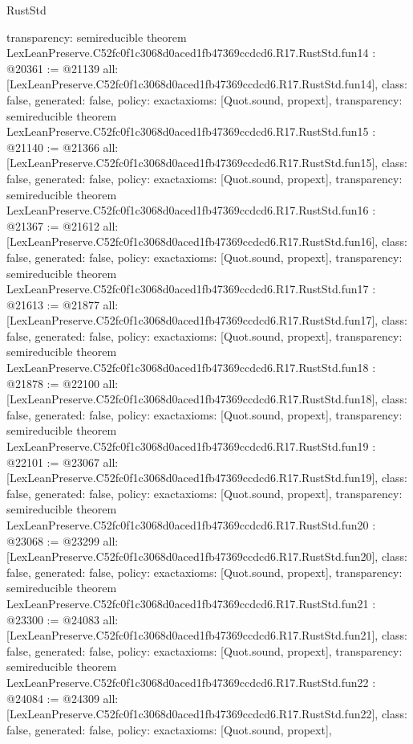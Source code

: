 \begin{lexlean}{RustStd}
\begin{coremodule}
{  transparency: semireducible
}
theorem LexLeanPreserve.C52fc0f1c3068d0aced1fb47369ccdcd6.R17.RustStd.fun14 : @20361 := @21139 {
  all: [LexLeanPreserve.C52fc0f1c3068d0aced1fb47369ccdcd6.R17.RustStd.fun14],
  class: false,
  generated: false,
  policy: exact{axioms: [Quot.sound, propext]},
  transparency: semireducible
}
theorem LexLeanPreserve.C52fc0f1c3068d0aced1fb47369ccdcd6.R17.RustStd.fun15 : @21140 := @21366 {
  all: [LexLeanPreserve.C52fc0f1c3068d0aced1fb47369ccdcd6.R17.RustStd.fun15],
  class: false,
  generated: false,
  policy: exact{axioms: [Quot.sound, propext]},
  transparency: semireducible
}
theorem LexLeanPreserve.C52fc0f1c3068d0aced1fb47369ccdcd6.R17.RustStd.fun16 : @21367 := @21612 {
  all: [LexLeanPreserve.C52fc0f1c3068d0aced1fb47369ccdcd6.R17.RustStd.fun16],
  class: false,
  generated: false,
  policy: exact{axioms: [Quot.sound, propext]},
  transparency: semireducible
}
theorem LexLeanPreserve.C52fc0f1c3068d0aced1fb47369ccdcd6.R17.RustStd.fun17 : @21613 := @21877 {
  all: [LexLeanPreserve.C52fc0f1c3068d0aced1fb47369ccdcd6.R17.RustStd.fun17],
  class: false,
  generated: false,
  policy: exact{axioms: [Quot.sound, propext]},
  transparency: semireducible
}
theorem LexLeanPreserve.C52fc0f1c3068d0aced1fb47369ccdcd6.R17.RustStd.fun18 : @21878 := @22100 {
  all: [LexLeanPreserve.C52fc0f1c3068d0aced1fb47369ccdcd6.R17.RustStd.fun18],
  class: false,
  generated: false,
  policy: exact{axioms: [Quot.sound, propext]},
  transparency: semireducible
}
theorem LexLeanPreserve.C52fc0f1c3068d0aced1fb47369ccdcd6.R17.RustStd.fun19 : @22101 := @23067 {
  all: [LexLeanPreserve.C52fc0f1c3068d0aced1fb47369ccdcd6.R17.RustStd.fun19],
  class: false,
  generated: false,
  policy: exact{axioms: [Quot.sound, propext]},
  transparency: semireducible
}
theorem LexLeanPreserve.C52fc0f1c3068d0aced1fb47369ccdcd6.R17.RustStd.fun20 : @23068 := @23299 {
  all: [LexLeanPreserve.C52fc0f1c3068d0aced1fb47369ccdcd6.R17.RustStd.fun20],
  class: false,
  generated: false,
  policy: exact{axioms: [Quot.sound, propext]},
  transparency: semireducible
}
theorem LexLeanPreserve.C52fc0f1c3068d0aced1fb47369ccdcd6.R17.RustStd.fun21 : @23300 := @24083 {
  all: [LexLeanPreserve.C52fc0f1c3068d0aced1fb47369ccdcd6.R17.RustStd.fun21],
  class: false,
  generated: false,
  policy: exact{axioms: [Quot.sound, propext]},
  transparency: semireducible
}
theorem LexLeanPreserve.C52fc0f1c3068d0aced1fb47369ccdcd6.R17.RustStd.fun22 : @24084 := @24309 {
  all: [LexLeanPreserve.C52fc0f1c3068d0aced1fb47369ccdcd6.R17.RustStd.fun22],
  class: false,
  generated: false,
  policy: exact{axioms: [Quot.sound, propext]},
}
\end{coremodule}
\end{lexlean}
